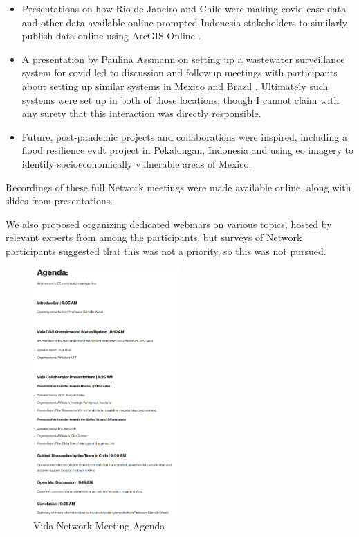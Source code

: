 \begin{itemize}[itemsep=0pt,parsep=0pt]
	\item{Presentations on how Rio de Janeiro and Chile were making \ac{covid} case data and other data available online prompted Indonesia stakeholders to similarly publish data online using ArcGIS Online \cite{indonesiaministryofhealthDataHarianKasus2023}.}
	\item{A presentation by Paulina Assmann on setting up a wastewater surveillance system for \ac{covid} led to discussion and followup meetings with participants about setting up similar systems in Mexico and Brazil \cite{assmannBuildingWastewaterSurveillance2021}. Ultimately such systems were set up in both of those locations, though I cannot claim with any surety that this interaction was directly responsible.}
	\item{Future, post-pandemic projects and collaborations were inspired, including a flood resilience \ac{evdt} project in Pekalongan, Indonesia and using \ac{eo} imagery to identify socioeconomically vulnerable areas of Mexico.}
\end{itemize}


Recordings of these full Network meetings were made available online, along with slides from presentations.

We also proposed organizing dedicated webinars on various topics, hosted by relevant experts from among the participants, but surveys of Network participants suggested that this was not a priority, so this was not pursued. 

\begin{figure}[!htb]
\centering
\includegraphics[width=0.5\textwidth]{Figures/chap5/vida-network-agenda.png}
\caption{Vida Network Meeting Agenda}
\label{fig:vida-network-agenda}
\end{figure}

